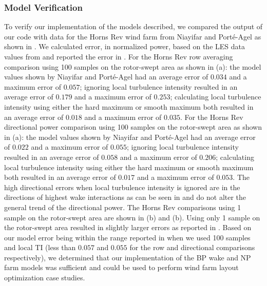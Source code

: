 \documentclass[conf]{new-aiaa}
\begin{document}
\subsubsection{Model Verification}
To verify our implementation of the models described, we compared the output of our code with data for the Horns Rev wind farm from Niayifar and Port\'{e}-Agel \cite{niayifar2016} as shown in . We calculated error, in normalized power, based on the LES data values from \cite{niayifar2016} and reported the error in . For the Horns Rev row averaging comparison using 100 samples on the rotor-swept area as shown in (a): the model values shown by Niayifar and Port\'{e}-Agel had an average error of $0.034$ and a maximum error of $0.057$; ignoring local turbulence intensity resulted in an average error of $0.179$ and a maximum error of $0.253$; calculating local turbulence intensity using either the hard maximum or smooth maximum both resulted in an average error of $0.018$ and a maximum error of $0.035$.  For the Horns Rev directional power comparison using 100 samples on the rotor-swept area as shown in (a): the model values shown by Niayifar and Port\'{e}-Agel had an average error of $0.022$ and a maximum error of $0.055$; ignoring local turbulence intensity resulted in an average error of $0.058$ and a maximum error of $0.206$; calculating local turbulence intensity using either the hard maximum or smooth maximum both resulted in an average error of $0.017$ and a maximum error of $0.053$. The high directional errors when local turbulence intensity is ignored are in the directions of highest wake interactions as can be seen in  and do not alter the general trend of the directional power. The Horns Rev comparisons using 1 sample on the rotor-swept area are shown in (b) and (b). Using only 1 sample on the rotor-swept area resulted in slightly larger errors as reported in . Based on our model error being within the range reported in \cite{niayifar2016} when we used 100 samples and local TI (less than $0.057$ and $0.055$ for the row and directional comparisons respectively), we determined that our implementation of the BP wake and NP farm models was sufficient and could be used to perform wind farm layout optimization case studies.
\end{document}
